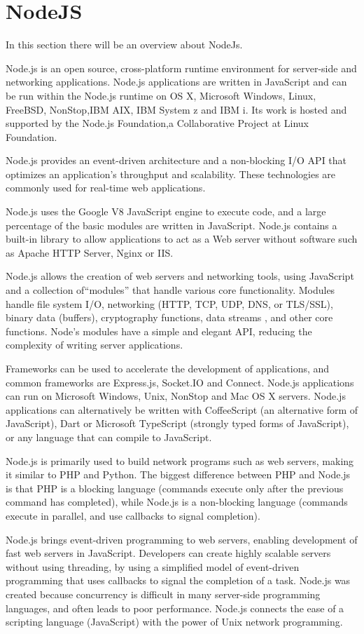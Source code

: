 \section{NodeJS}
\label{sec:TCH_nodejs}

In this section there will be an overview about NodeJs.

Node.js is an open source, cross-platform runtime environment for server-side and networking applications. Node.js applications are written in JavaScript and can be run within the Node.js runtime on OS X, Microsoft Windows, Linux, FreeBSD, NonStop,IBM AIX, IBM System z and IBM i. Its work is hosted and supported by the Node.js Foundation,a Collaborative Project at Linux Foundation.

Node.js provides an event-driven architecture and a non-blocking I/O API that optimizes an application's throughput and scalability. These technologies are commonly used for real-time web applications.

Node.js uses the Google V8 JavaScript engine to execute code, and a large percentage of the basic modules are written in JavaScript. Node.js contains a built-in library to allow applications to act as a Web server without software such as Apache HTTP Server, Nginx or IIS.

Node.js allows the creation of web servers and networking tools, using JavaScript and a collection of``modules'' that handle various core functionality. Modules handle file system I/O, networking (HTTP, TCP, UDP, DNS, or TLS/SSL), binary data (buffers), cryptography functions, data streams , and other core functions. Node's modules have a simple and elegant API, reducing the complexity of writing server applications.

Frameworks can be used to accelerate the development of applications, and common frameworks are Express.js, Socket.IO and Connect. Node.js applications can run on Microsoft Windows, Unix, NonStop and Mac OS X servers. Node.js applications can alternatively be written with CoffeeScript (an alternative form of JavaScript), Dart or Microsoft TypeScript (strongly typed forms of JavaScript), or any language that can compile to JavaScript.

Node.js is primarily used to build network programs such as web servers, making it similar to PHP and Python. The biggest difference between PHP and Node.js is that PHP is a blocking language (commands execute only after the previous command has completed), while Node.js is a non-blocking language (commands execute in parallel, and use callbacks to signal completion).

Node.js brings event-driven programming to web servers, enabling development of fast web servers in JavaScript. Developers can create highly scalable servers without using threading, by using a simplified model of event-driven programming that uses callbacks to signal the completion of a task. Node.js was created because concurrency is difficult in many server-side programming languages, and often leads to poor performance. Node.js connects the ease of a scripting language (JavaScript) with the power of Unix network programming.
